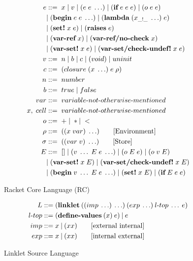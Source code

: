 \documentclass[sigplan,screen,anonymous]{acmart}
\def\dash {\text{-}}
\begin{document}
\begin{figure}[tbp]
  \begin{align*}
    e &::=\; x\; |\; v\; |\; (e\; e\; \ldots)\; |\; (\textbf{if}\; e\; e\; e)\; |\; (o\; e\; e)\; \\
    \; &|\; (\textbf{begin}\; e\; e\; \ldots)\; |\; (\textbf{lambda}\; (x_{\_!\_}\; \ldots)\; e)\\
    \; &|\; (\textbf{set!}\; x\; e)\; |\; (\textbf{raises}\; e)\\
    \; &|\; (\textbf{var\dash ref}\; x)\; |\; (\textbf{var\dash ref/no\dash check}\; x) \\
    \; &|\; (\textbf{var\dash set!}\; x\; e)\; |\; (\textbf{var\dash set/check\dash undef!}\; x\; e) \\
    v   &::=\; n\; |\; b\; |\; c\; |\; (void)\;|\; uninit \\ %
    c   &::=\; (closure\; (x\; \ldots)\; e\; \rho) \\
    n   &::=\; number \\
    b   &::=\; true\; |\; false \\
    var &::=\; variable\dash not\dash otherwise\dash mentioned \\ %
    x,\; cell &::=\; variable\dash not\dash otherwise\dash mentioned \\ %
    o  &::=\; +\; |\; * |\; < \\
    \rho   &::=\; ((x\; var)\; \ldots) \tag*{[Environment]}\\
    \sigma   &::=\; ((var\; v)\; \ldots) \tag*{[Store]}\\
    E   &::=\; []\; |\; (v\; \ldots\; E\; e\; \ldots)\; |\; (o\; E\; e)\; |\; (o\; v\; E) \\
    \;  &|\; (\textbf{var\dash set!}\; x\; E)\; |\; (\textbf{var\dash set/check\dash undef!}\; x\; E) \\
    \;  &|\; (\textbf{begin}\; v\; \ldots\; E\; e\; \ldots)\; |\; (\textbf{set!}\; x\; E)\; |\; (\textbf{if}\; E\; e\; e)
  \end{align*}
  \caption{Racket Core Language (RC)}
  \label{fig:racket-source}
\end{figure}

\begin{figure}[tbp]
  \begin{align*}
    L  &::= (\textbf{linklet}\:((imp\: \ldots)\: \ldots)\:(exp\: \ldots)\:l\dash top\:\ldots\:e)\\
    l\dash top &::= (\textbf{define\dash values}\:(x)\:e)\:|\:e \\
    imp &::= x\:|\:(x x) \tag*{[external internal]}\\
    exp &::= x\:|\:(x x) \tag*{[internal external]}
  \end{align*}
  \caption{Linklet Source Language}
  \label{fig:linklet-source}
\end{figure}
\end{document}

